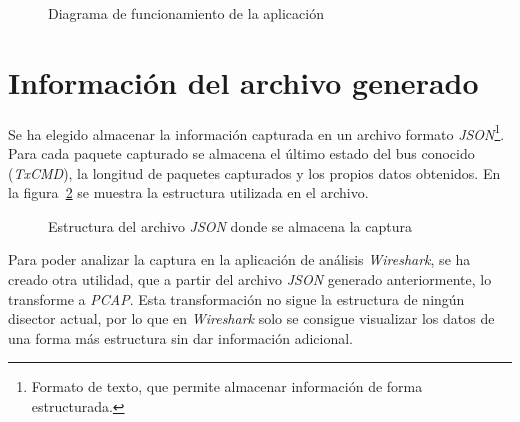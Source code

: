 \begin{enumerate}
    \begin{figure}[hbtp]
        \centering
        \scalebox{0.8} {}
        \caption{Diagrama de funcionamiento de la aplicación}
        \label{fig:flujo_app}
    \end{figure}
    
\end{enumerate}


\section{Información del archivo generado}
Se ha elegido almacenar la información capturada en un archivo formato \emph{JSON}\footnote{Formato de texto, que permite almacenar información de forma estructurada.}. Para cada paquete capturado se almacena el último estado del bus conocido (\emph{TxCMD}), la longitud de paquetes capturados y los propios datos obtenidos. En la figura~\ref{fig:tree-json} se muestra la estructura utilizada en el archivo.

\begin{figure}[!hbtp]
    \centering
    \begin{minipage}{6cm}
    \end{minipage}
    \caption{Estructura del archivo \emph{JSON} donde se almacena la captura}
    \label{fig:tree-json}
\end{figure}

Para poder analizar la captura en la aplicación de análisis \emph{Wireshark}, se ha creado otra utilidad, que a partir del archivo \emph{JSON} generado anteriormente, lo transforme a \emph{PCAP}. Esta transformación no sigue la estructura de ningún disector\cite{wiresharkdisector2014} actual, por lo que en \emph{Wireshark} solo se consigue visualizar los datos de una forma más estructura sin dar información adicional.




